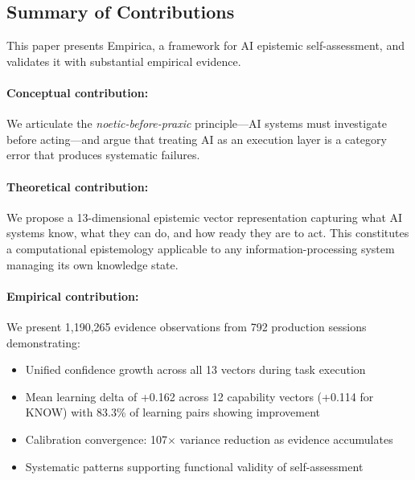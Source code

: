 
\subsection{Summary of Contributions}

This paper presents Empirica, a framework for AI epistemic self-assessment, and validates it with substantial empirical evidence.

\paragraph{Conceptual contribution:} We articulate the \emph{noetic-before-praxic} principle---AI systems must investigate before acting---and argue that treating AI as an execution layer is a category error that produces systematic failures.

\paragraph{Theoretical contribution:} We propose a 13-dimensional epistemic vector representation capturing what AI systems know, what they can do, and how ready they are to act. This constitutes a computational epistemology applicable to any information-processing system managing its own knowledge state.

\paragraph{Empirical contribution:} We present 1,190,265 evidence observations from 792 production sessions demonstrating:
\begin{itemize}
    \item Unified confidence growth across all 13 vectors during task execution
    \item Mean learning delta of +0.162 across 12 capability vectors (+0.114 for KNOW) with 83.3\% of learning pairs showing improvement
    \item Calibration convergence: 107$\times$ variance reduction as evidence accumulates
    \item Systematic patterns supporting functional validity of self-assessment
\end{itemize}

